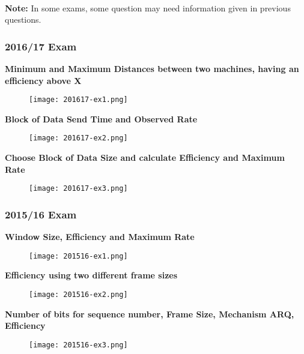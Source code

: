 \documentclass[../resumosRCOM.tex]{subfiles}
\begin{document}
\paragraph{}
\textbf{Note: } 
In some exams, some question may need information given in previous questions.

\subsubsection{2016/17 Exam}

\textbf{Minimum and Maximum Distances between two machines, having an 
efficiency above X}
\begin{figure}[H]
    \centering
    \texttt{[image: 201617-ex1.png]}
\end{figure}

\textbf{Block of Data Send Time and Observed Rate}
\begin{figure}[H]
    \centering
    \texttt{[image: 201617-ex2.png]}
\end{figure}

\textbf{Choose Block of Data Size and calculate Efficiency and Maximum Rate}
\begin{figure}[H]
    \centering
    \texttt{[image: 201617-ex3.png]}
\end{figure}

\subsubsection{2015/16 Exam}

\textbf{Window Size, Efficiency and Maximum Rate}
\begin{figure}[H]
    \centering
    \texttt{[image: 201516-ex1.png]}
\end{figure}

\textbf{Efficiency using two different frame sizes}
\begin{figure}[H]
    \centering
    \texttt{[image: 201516-ex2.png]}
\end{figure}

\textbf{Number of bits for sequence number, Frame Size, Mechanism ARQ, Efficiency}
\begin{figure}[H]
    \centering
    \texttt{[image: 201516-ex3.png]}
\end{figure}
\end{document}
